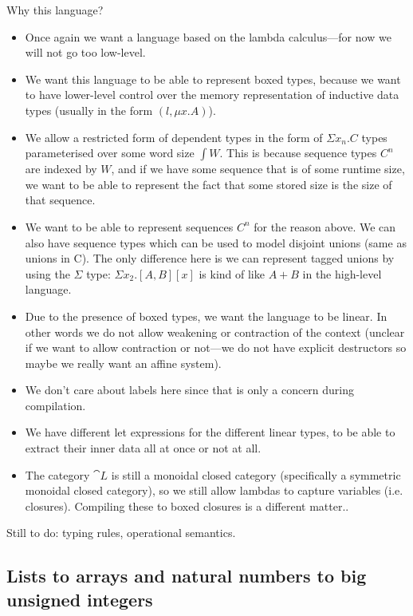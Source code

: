 Why this language?

\begin{itemize}
  \item Once again we want a language based on the lambda calculus---for now we will
        not go too low-level.
  \item We want this language to be able to represent boxed types, because we want to
        have lower-level control over the memory representation of inductive data types
        (usually in the form $(l, \mu x . A)$).
  \item We allow a restricted form of dependent types in the form of $\Sigma x_n . C$
        types parameterised over some word size $\int W$. This is because sequence
        types $C^n$ are indexed by $W$, and if we have some sequence that is of some
        runtime size, we want to be able to represent the fact that some stored size is
        the size of that sequence.
  \item We want to be able to represent sequences $C^n$ for the reason above. We can
        also have sequence types which can be used to model disjoint unions (same as
        unions in C). The only difference here is we can represent tagged unions by
        using the $\Sigma$ type: $\Sigma x_2 . [A, B][x]$ is kind of like $A + B$ in
        the high-level language.
  \item Due to the presence of boxed types, we want the language to be linear. In other
        words we do not allow weakening or contraction of the context (unclear if we
        want to allow contraction or not---we do not have explicit destructors so maybe
        we really want an affine system).
  \item We don't care about labels here since that is only a concern during
        compilation.
  \item We have different let expressions for the different linear types, to be able to
        extract their inner data all at once or not at all.
  \item The category $\cat L$ is still a monoidal closed category (specifically a
        symmetric monoidal closed category), so we still allow lambdas to capture
        variables (i.e. closures). Compiling these to boxed closures is a different
        matter..
\end{itemize}

Still to do: typing rules, operational semantics.

\subsection{Lists to arrays and natural numbers to big unsigned integers}

